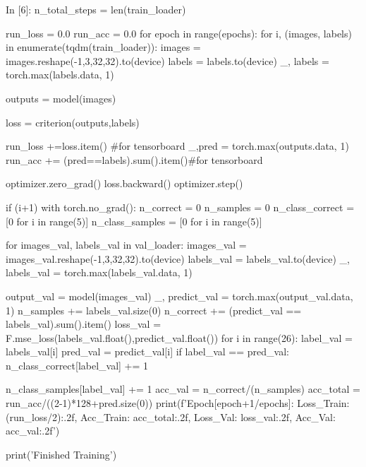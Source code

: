 \documentclass[12pt, a4paper]{article}
\begin{document}
\begin{python}
In [6]:
n_total_steps = len(train_loader)

run_loss = 0.0
run_acc = 0.0
for epoch in range(epochs):
    for i, (images, labels) in enumerate(tqdm(train_loader)):
        images = images.reshape(-1,3,32,32).to(device)
        labels = labels.to(device)
        _, labels = torch.max(labels.data, 1)

        outputs = model(images)

        loss = criterion(outputs,labels)
        
        run_loss +=loss.item() #for tensorboard
        _,pred = torch.max(outputs.data, 1)
        run_acc += (pred==labels).sum().item()#for tensorboard
        
        optimizer.zero_grad()
        loss.backward()
        optimizer.step()
        
        if (i+1) %
            with torch.no_grad():
                n_correct = 0
                n_samples = 0
                n_class_correct = [0 for i in range(5)]
                n_class_samples = [0 for i in range(5)]
                
                for images_val, labels_val in val_loader:
                    images_val = images_val.reshape(-1,3,32,32).to(device)
                    labels_val = labels_val.to(device)
                    _, labels_val = torch.max(labels_val.data, 1)
                    
                    output_val = model(images_val)
                    _, predict_val = torch.max(output_val.data, 1)
                    n_samples += labels_val.size(0)
                    n_correct += (predict_val == labels_val).sum().item()
                    loss_val = F.mse_loss(labels_val.float(),predict_val.float())
                    for i in range(26):
                        label_val = labels_val[i]
                        pred_val = predict_val[i]
                        if label_val == pred_val:
                            n_class_correct[label_val] += 1
                            
                        n_class_samples[label_val] += 1      
                acc_val = n_correct/(n_samples)
                acc_total = run_acc/((2-1)*128+pred.size(0))
                print(f'Epoch[{epoch+1}/{epochs}]:  Loss_Train: {(run_loss/2):.2f}, Acc_Train: {acc_total:.2f}, Loss_Val: {loss_val:.2f}, Acc_Val: {acc_val:.2f}')

print('Finished Training')
\end{python}
\end{document}
